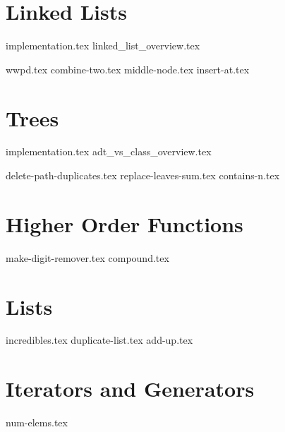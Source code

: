 \documentclass{exam}
\begin{document}
\section{Linked Lists}
{implementation.tex}
{linked_list_overview.tex}

\begin{questions}
    {wwpd.tex}
    {combine-two.tex}
    {middle-node.tex}
    \newpage
    {insert-at.tex}
\end{questions}
\newpage

\section{Trees}
    {implementation.tex}
    {adt_vs_class_overview.tex}
\newpage
\begin{questions}
    {delete-path-duplicates.tex}
    \newpage
    {replace-leaves-sum.tex}
    \newpage
    {contains-n.tex}
\end{questions}

\section{Higher Order Functions}
\begin{questions}
    {make-digit-remover.tex}
    {compound.tex}
\end{questions}

\section{Lists}
\begin{questions}
    {incredibles.tex}
    {duplicate-list.tex}
    {add-up.tex}
\end{questions}

\newpage
\section{Iterators and Generators}
\begin{questions}
    {num-elems.tex}
\end{questions}
\end{document}

